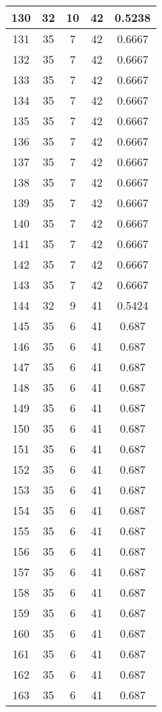\documentclass[letterpaper, 12pt]{article}
\begin{document}
\begin{longtable}{|c|c|c|c|c|}
\hline
130 & 32 & 10 & 42 & 0.5238 \\
\hline
131 & 35 & 7 & 42 & 0.6667 \\
\hline
132 & 35 & 7 & 42 & 0.6667 \\
\hline
133 & 35 & 7 & 42 & 0.6667 \\
\hline
134 & 35 & 7 & 42 & 0.6667 \\
\hline
135 & 35 & 7 & 42 & 0.6667 \\
\hline
136 & 35 & 7 & 42 & 0.6667 \\
\hline
137 & 35 & 7 & 42 & 0.6667 \\
\hline
138 & 35 & 7 & 42 & 0.6667 \\
\hline
139 & 35 & 7 & 42 & 0.6667 \\
\hline
140 & 35 & 7 & 42 & 0.6667 \\
\hline
141 & 35 & 7 & 42 & 0.6667 \\
\hline
142 & 35 & 7 & 42 & 0.6667 \\
\hline
143 & 35 & 7 & 42 & 0.6667 \\
\hline
144 & 32 & 9 & 41 & 0.5424 \\
\hline
145 & 35 & 6 & 41 & 0.687 \\
\hline
146 & 35 & 6 & 41 & 0.687 \\
\hline
147 & 35 & 6 & 41 & 0.687 \\
\hline
148 & 35 & 6 & 41 & 0.687 \\
\hline
149 & 35 & 6 & 41 & 0.687 \\
\hline
150 & 35 & 6 & 41 & 0.687 \\
\hline
151 & 35 & 6 & 41 & 0.687 \\
\hline
152 & 35 & 6 & 41 & 0.687 \\
\hline
153 & 35 & 6 & 41 & 0.687 \\
\hline
154 & 35 & 6 & 41 & 0.687 \\
\hline
155 & 35 & 6 & 41 & 0.687 \\
\hline
156 & 35 & 6 & 41 & 0.687 \\
\hline
157 & 35 & 6 & 41 & 0.687 \\
\hline
158 & 35 & 6 & 41 & 0.687 \\
\hline
159 & 35 & 6 & 41 & 0.687 \\
\hline
160 & 35 & 6 & 41 & 0.687 \\
\hline
161 & 35 & 6 & 41 & 0.687 \\
\hline
162 & 35 & 6 & 41 & 0.687 \\
\hline
163 & 35 & 6 & 41 & 0.687 \\

\end{longtable}
\end{document}
